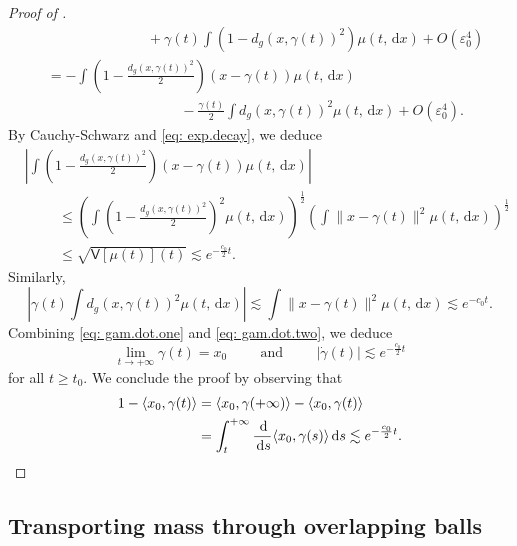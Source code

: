 \documentclass[a4paper,11pt]{article}
\theoremstyle{plain}
\newcommand{\diff}{\, \mathrm{d}}
\renewcommand{\leq}{\leqslant}
\renewcommand{\geq}{\geqslant}
\numberwithin{equation}{section}
\begin{document}
\begin{proof}[Proof of ]
\begin{align*}
    &\hspace{3cm}+\gamma(t)\int (1-d_g(x,\gamma(t))^2)\mu(t,\diff x)+O\left(\varepsilon_0^4\right)\nonumber\\
    &=-\int\left(1-\frac{d_g(x,\gamma(t))^2}{2}\right)(x-\gamma(t))\mu(t,\diff x)\nonumber\\
    &\hspace{4cm}-\frac{\gamma(t)}{2}\int d_g(x,\gamma(t))^2\mu(t,\diff x)+O\left(\varepsilon_0^4\right).
\end{align*}
By Cauchy-Schwarz and \eqref{eq: exp.decay}, we deduce
\begin{align}
    &\left|\int\left(1-\frac{d_g(x,\gamma(t))^2}{2}\right)(x-\gamma(t))\mu(t,\diff x)\right|\nonumber\\
    &\hspace{1cm}\leq \left(\int\left(1-\frac{d_g(x,\gamma(t))^2}{2}\right)^2\mu(t,\diff x)\right)^{\frac{1}{2}}\left(\int\|x-\gamma(t)\|^2\mu(t,\diff x)\right)^{\frac{1}{2}}\nonumber\\
    &\hspace{1cm}\leq\sqrt{\mathsf{V}[\mu(t)](t)}\lesssim e^{-\frac{c_0}{2}t}.\label{eq: gam.dot.one}
\end{align}
Similarly,
\begin{equation}\label{eq: gam.dot.two}
    \left|\gamma(t)\int d_g(x,\gamma(t))^2\mu(t,\diff x)\right|\lesssim \int \|x-\gamma(t)\|^2\mu(t,\diff x)\lesssim e^{-c_0t}.
\end{equation}
Combining \eqref{eq: gam.dot.one} and \eqref{eq: gam.dot.two}, we deduce
\begin{equation*}
    \lim_{t\to +\infty}\gamma(t)=x_0\hspace{1cm}\text{and}\hspace{1cm} |\dot{\gamma}(t)|\lesssim e^{-\frac{c_0}{2} t}
\end{equation*}
for all $t\geq t_0$. We conclude the proof by observing that 
\begin{align*}
    1-\langle x_0, \gamma(t)\rangle &=\langle x_0,\gamma(+\infty)\rangle-\langle x_0,\gamma(t)\rangle\\
    &=\int_t^{+\infty}\frac{\diff}{\diff s} \langle x_0,\gamma(s)\rangle \diff s\lesssim e^{-\frac{c_0}{2}t}. \qedhere
\end{align*}
\end{proof}

\subsection{Transporting mass through overlapping balls} 
\label{proof: tubular.mass.movement}
\end{document}
